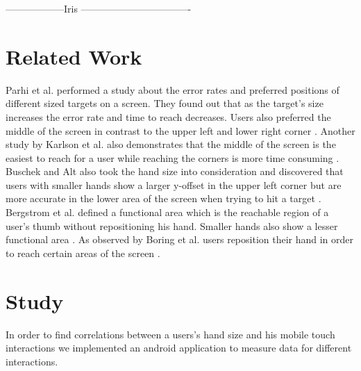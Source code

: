 \documentclass{sigchi}
\begin{document}
------------------Iris ----------------------------------
\section{Related Work}
Parhi et al. performed a study about the error rates and preferred positions of different sized targets on a screen. They found out that as the target's size increases the error rate and time to reach decreases. Users also preferred the middle of the screen in contrast to the upper left and lower right corner \cite{parhi2006target}. Another study by Karlson et al. also demonstrates that the middle of the screen is the easiest to reach for a user while reaching the corners is more time consuming \cite{karlson2006studies}. Buschek and Alt also took the hand size into consideration and discovered that users with smaller hands show a larger y-offset in the upper left corner but are more accurate in the lower area of the screen when trying to hit a target \cite{buschek2015touchml}.  Bergstrom et al. defined a functional area which is the reachable region of a user's thumb without repositioning his hand. Smaller hands also show a lesser functional area \cite{bergstrom2014modeling}. As observed by Boring et al. users reposition their hand in order to reach certain areas of the screen \cite{boring2012fat}. 

\section{Study}
In order to find correlations between a users's hand size and his mobile touch interactions we implemented an android application to measure data for different interactions. 
\end{document}

